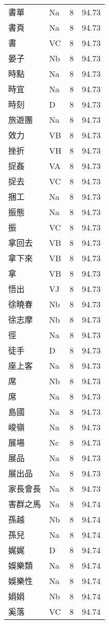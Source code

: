 \documentclass[twocolumn]{book}
\begin{document}
\begin{supertabular}{llrr}
書單 & Na & 8 &  94.73\\
書頁 & Na & 8 &  94.73\\
書 & VC & 8 &  94.73\\
晏子 & Nb & 8 &  94.73\\
時點 & Na & 8 &  94.73\\
時宜 & Na & 8 &  94.73\\
時刻 & D & 8 &  94.73\\
旅遊團 & Na & 8 &  94.73\\
效力 & VB & 8 &  94.73\\
挫折 & VH & 8 &  94.73\\
捉姦 & VA & 8 &  94.73\\
捉去 & VC & 8 &  94.73\\
捆工 & Na & 8 &  94.73\\
振態 & Na & 8 &  94.73\\
振 & VC & 8 &  94.73\\
拿回去 & VB & 8 &  94.73\\
拿下來 & VB & 8 &  94.73\\
拿 & VB & 8 &  94.73\\
悟出 & VJ & 8 &  94.73\\
徐曉春 & Nb & 8 &  94.73\\
徐志摩 & Nb & 8 &  94.73\\
徑 & Na & 8 &  94.73\\
徒手 & D & 8 &  94.73\\
座上客 & Na & 8 &  94.73\\
席 & Nb & 8 &  94.73\\
席 & Na & 8 &  94.73\\
島國 & Na & 8 &  94.73\\
峻嶺 & Na & 8 &  94.73\\
展場 & Nc & 8 &  94.73\\
展品 & Na & 8 &  94.73\\
展出品 & Na & 8 &  94.73\\
家長會長 & Na & 8 &  94.73\\
害群之馬 & Na & 8 &  94.74\\
孫越 & Nb & 8 &  94.74\\
孫兒 & Na & 8 &  94.74\\
娓娓 & D & 8 &  94.74\\
娛樂類 & Na & 8 &  94.74\\
娛樂性 & Na & 8 &  94.74\\
娟娟 & Nb & 8 &  94.74\\
奚落 & VC & 8 &  94.74\\

\end{supertabular}
\end{document}
